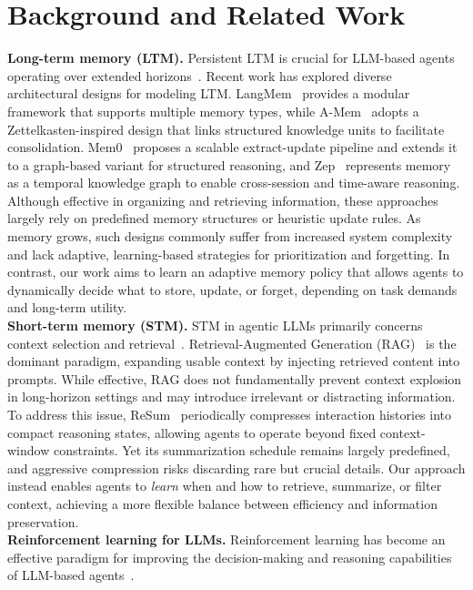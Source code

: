 \section{Background and Related Work}
\textbf{Long-term memory (LTM).} 
Persistent LTM is crucial for LLM-based agents operating over extended horizons~\citep{wang2025karma, li2025hello}.
Recent work has explored diverse architectural designs for modeling LTM. 
LangMem~\citep{langmem2025} provides a modular framework that supports multiple memory types, while A-Mem~\citep{xu2025mem} adopts a Zettelkasten-inspired design that links structured knowledge units to facilitate consolidation. 
Mem0~\citep{chhikara2025mem0} proposes a scalable extract-update pipeline and extends it to a graph-based variant for structured reasoning, and Zep~\citep{rasmussen2025zep} represents memory as a temporal knowledge graph to enable cross-session and time-aware reasoning. Although effective in organizing and retrieving information, these approaches largely rely on predefined memory structures or heuristic update rules. 
As memory grows, such designs commonly suffer from increased system complexity and lack adaptive, learning-based strategies for prioritization and forgetting.
In contrast, our work aims to learn an adaptive memory policy that allows agents to dynamically decide what to store, update, or forget, depending on task demands and long-term utility.
\\
\textbf{Short-term memory (STM).} 
STM in agentic LLMs primarily concerns context selection and retrieval~\citep{wang2024agent, jin2024llm}.
Retrieval-Augmented Generation (RAG)~\citep{pan2025memory, salama2025meminsight, kagaya2024rap} is the dominant paradigm, expanding usable context by injecting retrieved content into prompts.
While effective, RAG does not fundamentally prevent context explosion in long-horizon settings and may introduce irrelevant or distracting information.
To address this issue, ReSum~\citep{wu2025resum} periodically compresses interaction histories into compact reasoning states, allowing agents to operate beyond fixed context-window constraints. 
Yet its summarization schedule remains largely predefined, and aggressive compression risks discarding rare but crucial details.
Our approach instead enables agents to \emph{learn} when and how to retrieve, summarize, or filter context, achieving a more flexible balance between efficiency and information preservation.
\\
\textbf{Reinforcement learning for LLMs.} 
Reinforcement learning has become an effective paradigm for improving the decision-making and reasoning capabilities of LLM-based agents~\citep{yao2022react, jin2025search, qian2025toolrl, chaudhari2025rlhf}. 
